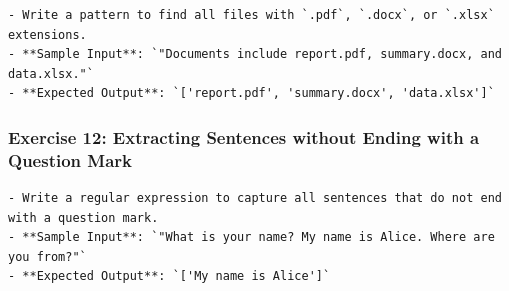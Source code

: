 \documentclass[
  letterpaper,
  DIV=11,
  numbers=noendperiod]{scrreprt}
\begin{document}
\begin{verbatim}
- Write a pattern to find all files with `.pdf`, `.docx`, or `.xlsx` extensions.
- **Sample Input**: `"Documents include report.pdf, summary.docx, and data.xlsx."`
- **Expected Output**: `['report.pdf', 'summary.docx', 'data.xlsx']`
\end{verbatim}

\hypertarget{exercise-12-extracting-sentences-without-ending-with-a-question-mark}{%
\subsubsection{Exercise 12: Extracting Sentences without Ending with a
Question
Mark}\label{exercise-12-extracting-sentences-without-ending-with-a-question-mark}}

\begin{verbatim}
- Write a regular expression to capture all sentences that do not end with a question mark.
- **Sample Input**: `"What is your name? My name is Alice. Where are you from?"`
- **Expected Output**: `['My name is Alice']`
\end{verbatim}
\end{document}

